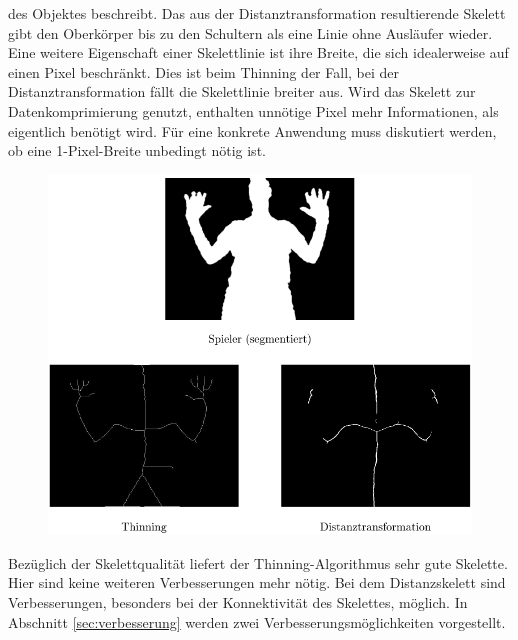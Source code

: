 des Objektes beschreibt. Das aus der Distanztransformation resultierende Skelett gibt den Oberkörper bis
zu den Schultern als eine Linie ohne Ausläufer wieder.\\
Eine weitere Eigenschaft einer Skelettlinie ist ihre Breite, die sich idealerweise auf einen Pixel beschränkt. Dies ist beim Thinning der Fall, bei der Distanztransformation fällt die Skelettlinie breiter
aus. Wird das Skelett zur Datenkomprimierung genutzt, enthalten unnötige Pixel mehr Informationen, als 
eigentlich benötigt wird. Für eine konkrete Anwendung muss diskutiert werden, ob eine 1-Pixel-Breite unbedingt nötig ist.\\
\begin{figure}[htbp]
\centering
\includegraphics[width=1.0\linewidth]{./fig/vergleich-screenshot12}
\caption{}
\label{fig:vergleich-screenshot12}
\end{figure}
Bezüglich der Skelettqualität liefert der Thinning-Algorithmus sehr
gute Skelette. Hier sind keine weiteren Verbesserungen mehr nötig.
Bei dem Distanzskelett sind Verbesserungen, besonders bei der 
Konnektivität des Skelettes, möglich. In Abschnitt \ref{sec:verbesserung} werden zwei Verbesserungsmöglichkeiten vorgestellt.
